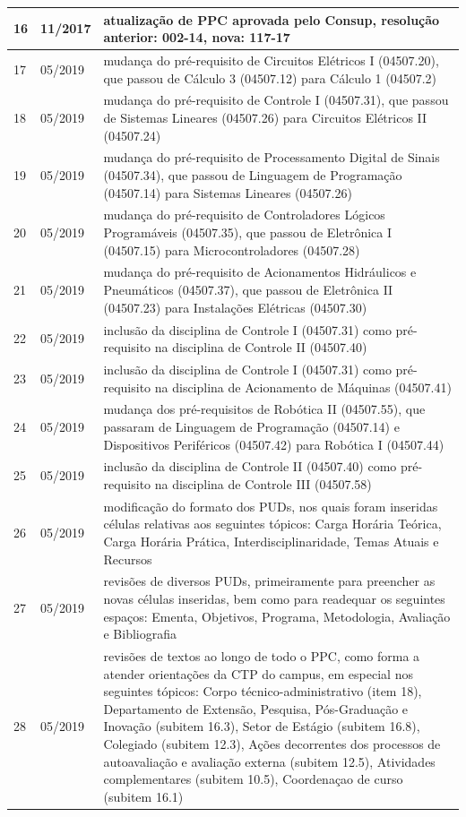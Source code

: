 \begin{center}
\begin{longtable}{lp{2cm}p{11cm}}
		16 & 11/2017 & atualização de PPC aprovada pelo Consup, resolução anterior: 002-14, nova: 117-17\\ \hline
		17 & 05/2019 & mudança do pré-requisito de Circuitos Elétricos I (04507.20), que passou de Cálculo 3 (04507.12) para Cálculo 1 (04507.2) \\ \hline
		18 & 05/2019 & mudança do pré-requisito de Controle I (04507.31), que passou de Sistemas Lineares (04507.26) para Circuitos Elétricos II (04507.24) \\ \hline
		19 & 05/2019 & mudança do pré-requisito de Processamento Digital de Sinais (04507.34), que passou de Linguagem de Programação (04507.14) para Sistemas Lineares (04507.26) \\ \hline
		20 & 05/2019 & mudança do pré-requisito de Controladores Lógicos Programáveis (04507.35), que passou de Eletrônica I (04507.15) para Microcontroladores (04507.28) \\ \hline
		21 & 05/2019 & mudança do pré-requisito de Acionamentos Hidráulicos e Pneumáticos (04507.37), que passou de Eletrônica II (04507.23) para Instalações Elétricas (04507.30) \\ \hline
		22 & 05/2019 & inclusão da disciplina de Controle I (04507.31) como pré-requisito na disciplina de Controle II (04507.40) \\ \hline
		23 & 05/2019 & inclusão da disciplina de Controle I (04507.31) como pré-requisito na disciplina de Acionamento de Máquinas (04507.41) \\ \hline
		24 & 05/2019 & mudança dos pré-requisitos de Robótica II (04507.55), que passaram de Linguagem de Programação (04507.14) e Dispositivos Periféricos (04507.42) para Robótica I (04507.44) \\ \hline
		25 & 05/2019 & inclusão da disciplina de Controle II (04507.40) como pré-requisito na disciplina de Controle III (04507.58) \\ \hline
		26 & 05/2019 & modificação do formato dos PUDs, nos quais foram inseridas células relativas aos seguintes tópicos: Carga Horária Teórica, Carga Horária Prática, Interdisciplinaridade, Temas Atuais e Recursos \\ \hline
		27 & 05/2019 & revisões de diversos PUDs, primeiramente para preencher as novas células inseridas, bem como para readequar os seguintes espaços: Ementa, Objetivos, Programa, Metodologia, Avaliação e Bibliografia \\ \hline
		28 & 05/2019 & revisões de textos ao longo de todo o PPC, como forma a atender orientações da CTP do campus, em especial nos seguintes tópicos: Corpo técnico-administrativo (item 18), Departamento de Extensão, Pesquisa, Pós-Graduação e Inovação (subitem 16.3), Setor de Estágio (subitem 16.8), Colegiado (subitem 12.3), Ações decorrentes dos processos de autoavaliação e avaliação externa (subitem 12.5), Atividades complementares (subitem 10.5), Coordenaçao de curso (subitem 16.1) \\ \hline

\end{longtable}
\end{center}
